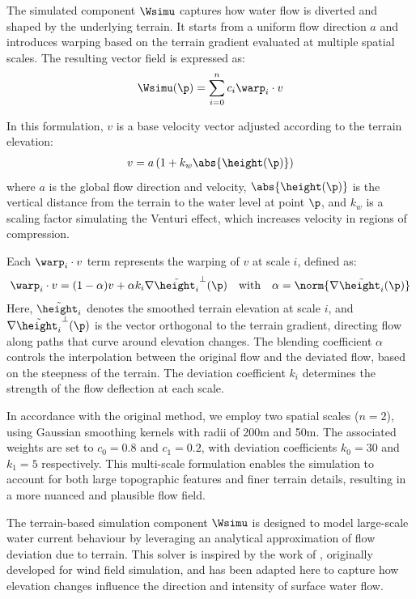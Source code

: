 The simulated component $\Wsimu$ captures how water flow is diverted and shaped by the underlying terrain. It starts from a uniform flow direction $a$ and introduces warping based on the terrain gradient evaluated at multiple spatial scales. The resulting vector field is expressed as:
\begin{align}
    \Wsimu(\p) = \sum_{i=0}^{n}{c_i \warp_i \cdot v}
\end{align}

In this formulation, $v$ is a base velocity vector adjusted according to the terrain elevation:
\begin{align}
    v = a \left(1 + k_w \abs{\height(\p)} \right)
\end{align}
where $a$ is the global flow direction and velocity, $\abs{\height(\p)}$ is the vertical distance from the terrain to the water level at point $\p$, and $k_w$ is a scaling factor simulating the Venturi effect, which increases velocity in regions of compression.

Each $\warp_i \cdot v$ term represents the warping of $v$ at scale $i$, defined as:
\begin{align}
    \warp_i \cdot v = (1 - \alpha) v + \alpha k_i \nabla \Tilde{\height_i}^{\perp}(\p) \quad \text{with} \quad \alpha = \norm{ \nabla \Tilde{\height_i}(\p) }
\end{align}
Here, $\Tilde{\height_i}$ denotes the smoothed terrain elevation at scale $i$, and $\nabla \Tilde{\height_i}^{\perp}(\p)$ is the vector orthogonal to the terrain gradient, directing flow along paths that curve around elevation changes. The blending coefficient $\alpha$ controls the interpolation between the original flow and the deviated flow, based on the steepness of the terrain. The deviation coefficient $k_i$ determines the strength of the flow deflection at each scale.

In accordance with the original method, we employ two spatial scales ($n = 2$), using Gaussian smoothing kernels with radii of 200m and 50m. The associated weights are set to $c_0 = 0.8$ and $c_1 = 0.2$, with deviation coefficients $k_0 = 30$ and $k_1 = 5$ respectively. This multi-scale formulation enables the simulation to account for both large topographic features and finer terrain details, resulting in a more nuanced and plausible flow field.

The terrain-based simulation component $\Wsimu$ is designed to model large-scale water current behaviour by leveraging an analytical approximation of flow deviation due to terrain. This solver is inspired by the work of \cite{Paris2019b}, originally developed for wind field simulation, and has been adapted here to capture how elevation changes influence the direction and intensity of surface water flow.

